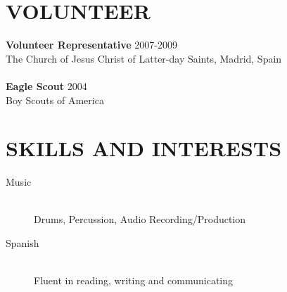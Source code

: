 \documentclass[margin]{res}
\begin{document}
\begin{resume}
    \section{VOLUNTEER}
      {\bf Volunteer Representative} \hfill 2007-2009 \\
      The Church of Jesus Christ of Latter-day Saints, Madrid, Spain \\ \\
      {\bf Eagle Scout} \hfill 2004 \\
      Boy Scouts of America

    \section{SKILLS AND INTERESTS}
      \begin{description}
        \item[Music] \hfill \\
        Drums, Percussion, Audio Recording/Production
        \item[Spanish] \hfill \\
        Fluent in reading, writing and communicating
      \end{description}
            
  \end{resume}
\end{document}
